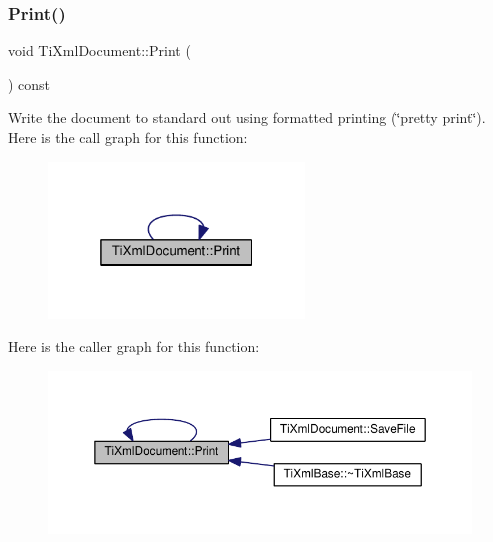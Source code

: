 \subsubsection{\texorpdfstring{Print()}{Print()}\hspace{0.1cm}{\footnotesize\ttfamily [1/2]}}
{\footnotesize\ttfamily void Ti\+Xml\+Document\+::\+Print (\begin{DoxyParamCaption}{ }\end{DoxyParamCaption}) const\hspace{0.3cm}{\ttfamily [inline]}}

Write the document to standard out using formatted printing (\char`\"{}pretty print\char`\"{}). Here is the call graph for this function\+:
\nopagebreak
\begin{figure}[H]
\begin{center}
\leavevmode
\includegraphics[width=193pt]{class_ti_xml_document_aa4e8c1498a76dcde7191c683e1220882_cgraph}
\end{center}
\end{figure}
Here is the caller graph for this function\+:
\nopagebreak
\begin{figure}[H]
\begin{center}
\leavevmode
\includegraphics[width=350pt]{class_ti_xml_document_aa4e8c1498a76dcde7191c683e1220882_icgraph}
\end{center}
\end{figure}
\mbox{\label{class_ti_xml_document_aa9e166fae51da603641380a964f21eeb}} 
